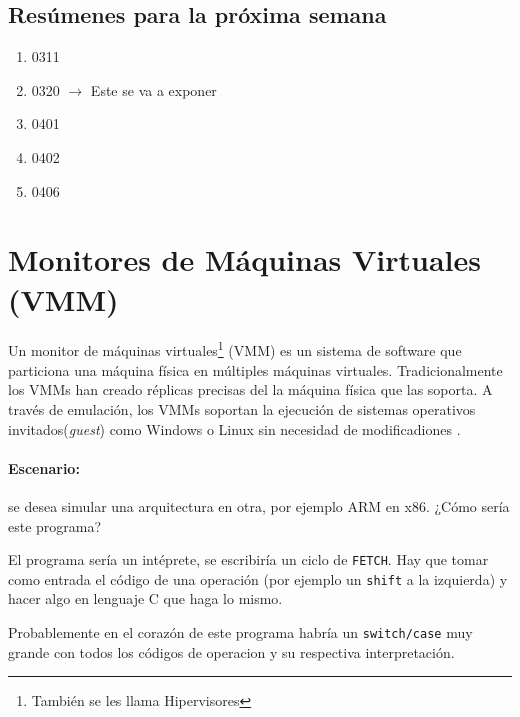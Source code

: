 \documentclass[12pt, times]{simauth}
\begin{document}
\subsection{Resúmenes para la próxima semana}
\begin{enumerate}
    \item 0311
    \item 0320 $\rightarrow$  Este se va a exponer
    \item 0401
    \item 0402
    \item 0406
\end{enumerate}

\newpage
\section{Monitores de Máquinas Virtuales (VMM)}
Un monitor de máquinas virtuales\footnote{También se les llama Hipervisores} (VMM) es un sistema de software que particiona una máquina física en múltiples máquinas virtuales. Tradicionalmente los VMMs han creado réplicas precisas del la máquina física que las soporta. A través de emulación, los VMMs soportan la ejecución de sistemas operativos invitados(\emph{guest}) como Windows o Linux sin necesidad de modificadiones \cite{whitaker}.


\paragraph{Escenario:}
se desea simular una arquitectura en otra, por ejemplo ARM en x86. ¿Cómo sería este programa? 

El programa sería un intéprete, se escribiría un ciclo de \texttt{FETCH}. Hay que tomar como entrada el código de una operación (por ejemplo un \texttt{shift} a la izquierda) y hacer algo  en lenguaje C que haga lo mismo.

Probablemente en el corazón de este programa habría un \texttt{switch/case} muy grande con todos los códigos de operacion y su respectiva interpretación.


\begin{algorithm}[H]
\DontPrintSemicolon
\end{algorithm}
\end{document}
